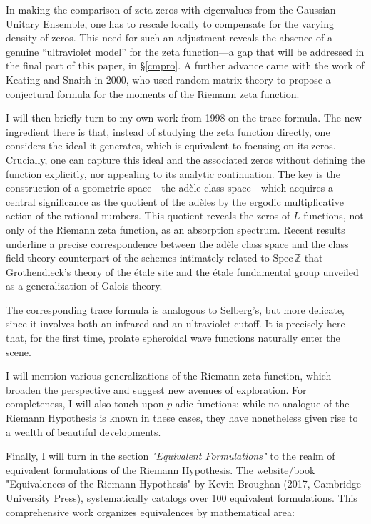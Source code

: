 \documentclass{article}
\begin{document}
 In making the comparison of zeta zeros with eigenvalues from the Gaussian Unitary Ensemble, one has to rescale locally to compensate for the varying density of zeros. This need for such an adjustment reveals the absence of a genuine ``ultraviolet model'' for the zeta function---a gap that will be addressed in the final part of this paper, in \S \ref{cmpro}.\newline  
A further advance came with the work of Keating and Snaith in 2000, who used random matrix theory to propose a conjectural formula for the moments of the Riemann zeta function.  

 I will then briefly turn to my own work from 1998 on the trace formula. The new ingredient there is that, instead of studying the zeta function directly, one considers the ideal it generates, which is equivalent to focusing on its zeros. Crucially, one can capture this ideal and the associated zeros without defining the function explicitly, nor appealing to its analytic continuation. The key is the construction of a geometric space---the ad\`ele class space---which acquires a central significance as the  quotient of the adèles by the ergodic multiplicative action of the rational numbers. This quotient reveals the zeros of $L$-functions, not only of the Riemann zeta function, as an absorption spectrum. Recent results underline a precise correspondence between the ad\`ele class space and the class field theory counterpart of the schemes intimately related to $\mathrm{Spec}\,\mathbb{Z}$ that Grothendieck’s theory of the \'etale site and the \'etale fundamental group unveiled as a generalization of Galois theory.  

The corresponding trace formula is analogous to Selberg’s, but more delicate, since it involves both an infrared and an ultraviolet cutoff. It is precisely here that, for the first time, prolate spheroidal wave functions naturally enter the scene.  

I will mention various generalizations of the Riemann zeta function, which broaden the perspective and suggest new avenues of exploration. For completeness, I will also touch upon $p$-adic functions: while no analogue of the Riemann Hypothesis is known in these cases, they have nonetheless given rise to a wealth of beautiful developments.  

Finally, I will turn in the section \textit{"Equivalent Formulations"} to the realm of equivalent formulations of the Riemann Hypothesis. The website/book  "Equivalences of the Riemann Hypothesis" by Kevin Broughan (2017, Cambridge University Press),  systematically catalogs over 100 equivalent formulations. This comprehensive work organizes equivalences by mathematical area:
\end{document}
